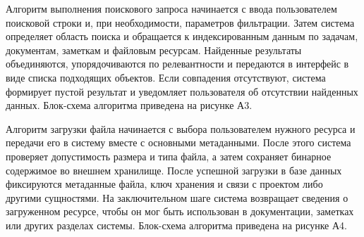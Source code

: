 
Алгоритм выполнения поискового запроса начинается с ввода пользователем поисковой строки и, при необходимости, параметров фильтрации. Затем система определяет область поиска и обращается к индексированным данным по задачам, документам, заметкам и файловым ресурсам. Найденные результаты объединяются, упорядочиваются по релевантности и передаются в интерфейс в виде списка подходящих объектов. Если совпадения отсутствуют, система формирует пустой результат и уведомляет пользователя об отсутствии найденных данных. Блок-схема алгоритма приведена на рисунке А3.


Алгоритм загрузки файла начинается с выбора пользователем нужного ресурса и передачи его в систему вместе с основными метаданными. После этого система проверяет допустимость размера и типа файла, а затем сохраняет бинарное содержимое во внешнем хранилище. После успешной загрузки в базе данных фиксируются метаданные файла, ключ хранения и связи с проектом либо другими сущностями. На заключительном шаге система возвращает сведения о загруженном ресурсе, чтобы он мог быть использован в документации, заметках или других разделах системы. Блок-схема алгоритма приведена на рисунке А4.